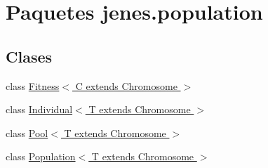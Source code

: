 \hypertarget{namespacejenes_1_1population}{\section{Paquetes jenes.\-population}
\label{namespacejenes_1_1population}
}
\subsection*{Clases}
\begin{DoxyCompactItemize}
\item 
class \hyperlink{classjenes_1_1population_1_1_fitness_3_01_c_01extends_01_chromosome_01_4}{Fitness$<$ C extends Chromosome $>$}
\item 
class \hyperlink{classjenes_1_1population_1_1_individual_3_01_t_01extends_01_chromosome_01_4}{Individual$<$ T extends Chromosome $>$}
\item 
class \hyperlink{classjenes_1_1population_1_1_pool_3_01_t_01extends_01_chromosome_01_4}{Pool$<$ T extends Chromosome $>$}
\item 
class \hyperlink{classjenes_1_1population_1_1_population_3_01_t_01extends_01_chromosome_01_4}{Population$<$ T extends Chromosome $>$}
\end{DoxyCompactItemize}
